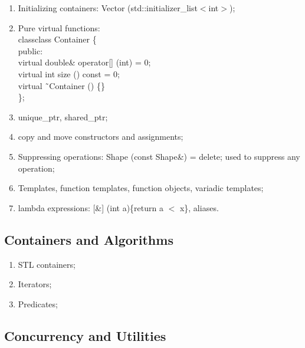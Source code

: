 \documentclass{article}
\begin{document}
\begin{enumerate}

  \item Initializing containers: Vector
    (std::initializer\_list$<${int}$>$);

  \item Pure virtual functions:\\
    classclass Container \{\\
      public:\\
      virtual double\& operator[] (int) = 0;\\
      virtual int size () const = 0;\\
      virtual ˜Container () \{\}\\
    \};

  \item unique\_ptr, shared\_ptr;

  \item copy and move constructors and assignments;

  \item Suppressing operations: Shape (const Shape\&) = delete; used to suppress
    any operation;

  \item Templates, function templates, function objects, variadic templates;

  \item lambda expressions: [\&] (int a)\{return a $<$ x\}, aliases.

\end{enumerate}

\subsection*{Containers and Algorithms}

\begin{enumerate}

  \item STL containers;

  \item Iterators;

  \item Predicates;

\end{enumerate}

\subsection*{Concurrency and Utilities}
\end{document}
